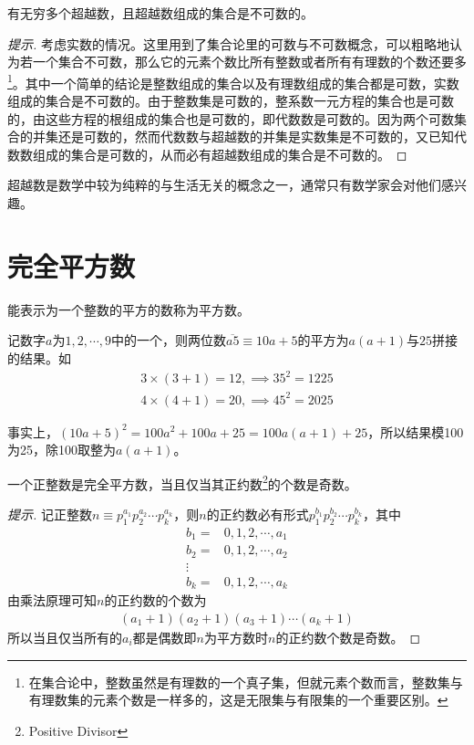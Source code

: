 \begin{theorem}
  有无穷多个超越数，且超越数组成的集合是不可数的。
\end{theorem}
\begin{proof}[提示]
  考虑实数的情况。这里用到了集合论里的可数与不可数概念，可以粗略地认为若一个集合不可数，那么它的元素个数比所有整数或者所有有理数的个数还要多\footnote{在集合论中，整数虽然是有理数的一个真子集，但就元素个数而言，整数集与有理数集的元素个数是一样多的，这是无限集与有限集的一个重要区别。}。其中一个简单的结论是整数组成的集合以及有理数组成的集合都是可数，实数组成的集合是不可数的。由于整数集是可数的，整系数一元方程的集合也是可数的，由这些方程的根组成的集合也是可数的，即代数数是可数的。因为两个可数集合的并集还是可数的，然而代数数与超越数的并集是实数集是不可数的，又已知代数数组成的集合是可数的，从而必有超越数组成的集合是不可数的。
\end{proof}

超越数是数学中较为纯粹的与生活无关的概念之一，通常只有数学家会对他们感兴趣。


\section{完全平方数}
\label{sec:perfect-squares}

\begin{definition}
  能表示为一个整数的平方的数称为平方数。
\end{definition}

\begin{example}[5结尾的两位数的平方]
  记数字$a$为$1,2,\cdots,9$中的一个，则两位数$\overline{a5}\equiv 10a + 5$的平方为$a(a+1)$与$25$拼接的结果。如
  \begin{align*}
    3\times(3+1) = 12, \implies 35^2 = 1225\\
    4\times(4+1) = 20, \implies 45^2 = 2025
  \end{align*}

  事实上，$(10a + 5)^2 = 100a^2 + 100a + 25 = 100a(a+1) + 25$，所以结果模100为25，除100取整为$a(a+1)$。
\end{example}

\begin{theorem}\label{th:count-of-positive-divisors-iff-square-number}
  一个正整数是完全平方数，当且仅当其正约数\footnote{Positive Divisor}的个数是奇数。
\end{theorem}
\begin{proof}[提示]
  记正整数$n\equiv p_1^{a_1} p_2^{a_2} \cdots p_k^{a_k}$，则$n$的正约数必有形式$p_1^{b_1} p_2^{b_2} \cdots p_k^{b_k}$，其中
  \begin{align*}
    b_1={}&0,1,2,\cdots,a_1\\
    b_2={}&0,1,2,\cdots,a_2\\
    \vdots\\
    b_k={}&0,1,2,\cdots,a_k
  \end{align*}
  由乘法原理可知$n$的正约数的个数为
  \begin{align*}
    (a_1 + 1) (a_2 + 1) (a_3 + 1) \cdots (a_k + 1)
  \end{align*}
  所以当且仅当所有的$a_i$都是偶数即$n$为平方数时$n$的正约数个数是奇数。
\end{proof}

